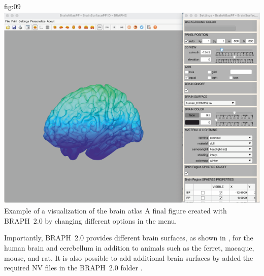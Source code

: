 \documentclass[justified]{tufte-handout}
\begin{document}
	{fig:09}
	{\includegraphics[height=10cm]{tut_ba/fig09.png}}
	{Example of a visualization of the brain atlas}
	{
	A final figure created with BRAPH~2.0 by changing different options in the menu.
	}

Importantly, BRAPH~2.0 provides different brain surfaces, as shown in , for the human brain and cerebellum in addition to animals such as the ferret, macaque, mouse, and rat.
It is also possible to add additional brain surfaces by added the required NV files in the BRAPH~2.0 folder .
\end{document}
